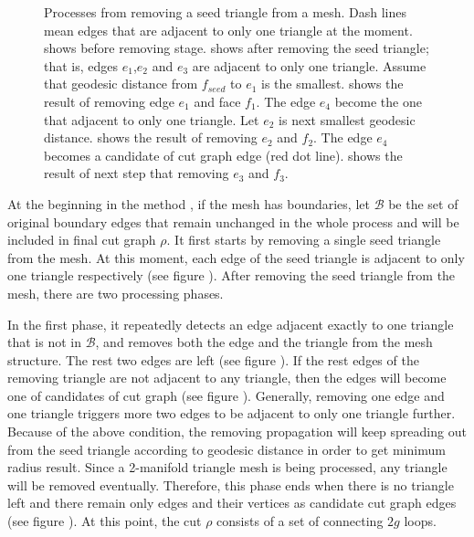 \documentclass[a4paper,twoside]{article}
\begin{document}
\begin{figure}[t]
	\caption{Processes from removing a seed triangle from a mesh. Dash lines mean edges that are adjacent to only one triangle at the moment.  shows before removing stage.  shows after removing the seed triangle; that is, edges $e_1$,$e_2$ and $e_3$ are adjacent to only one triangle. Assume that geodesic distance from $f_{seed}$ to $e_1$ is the smallest.  shows the result of removing edge $e_1$ and face $f_1$. The edge $e_4$ become the one that adjacent to only one triangle. Let $e_2$ is next smallest geodesic distance.  shows the result of removing $e_2$ and $f_2$. The edge $e_4$ becomes a candidate of cut graph edge (red dot line).  shows the result of next step that removing $e_3$ and $f_3$.}
	\label{fig:OriginalGenusReduceMethodStepByStep}
\end{figure}

At the beginning in the method , if the mesh has boundaries, let $\mathscr{B}$  be the set of original boundary edges that remain unchanged in the whole process and will be included in final cut graph ${\rho}$. It first starts by removing a single seed triangle from the mesh. At this moment, each edge of the seed triangle is adjacent to only one triangle respectively (see figure ).  After removing the seed triangle from the mesh, there are two processing phases.

In the first phase, it repeatedly detects an edge adjacent exactly to one triangle that is not in $\mathscr{B}$, and removes both the edge and the triangle from the mesh structure. The rest two edges are left (see figure ). If the rest edges of the removing triangle are not adjacent to any triangle, then the edges will become one of candidates of cut graph (see figure ). Generally, removing one edge and one triangle triggers more two edges to be adjacent to only one triangle further. Because of the above condition, the removing propagation will keep spreading out from the seed triangle according to geodesic distance in order to get minimum radius result. Since a 2-manifold triangle mesh is being processed, any triangle will be removed eventually. Therefore, this phase ends when there is no triangle left and there remain only edges and their vertices as candidate cut graph edges (see figure ). At this point, the cut $\rho$ consists of a set of connecting $2g$ loops.
\end{document}
